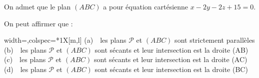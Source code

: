 \begin{enumerate}
	On admet que le plan $(ABC)$ a pour équation cartésienne $x-2 y-2 z+15=0$.
	
	On peut affirmer que :
	
	\medskip
	
	\begin{tblr}{width=\linewidth,colspec={*{1}{X[m,l]}}}
		(a)~~les plans $\mathcal{P}$ et $(ABC)$ sont strictement parallèles \\
		(b)~~les plans $\mathcal{P}$ et $(ABC)$ sont sécants et leur intersection est la droite (AB)\\
		(c)~~les plans $\mathcal{P}$ et $(ABC)$ sont sécants et leur intersection est la droite (AC)\\
		(d)~~les plans $\mathcal{P}$ et $(ABC)$ sont sécants et leur intersection est la droite (BC)\\
	\end{tblr}
\end{enumerate}
